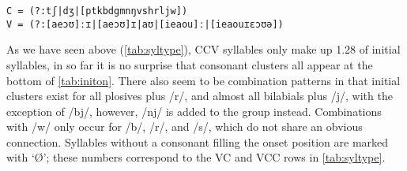 \ex
	\texttt{C = (?:tʃ|dʒ|[ptkbdgmnŋvshrljw])\\
	V = (?:[aeɔʊ]ːɪ|[aeɔʊ]ɪ|aʊ|[ieaou]ː|[ieaouɪɛɔʊə])}
\xe

As we have seen above (\autoref{tab:syltype}), CCV syllables only make up 
1.28\pct{} of initial syllables, in so far it is no surprise that consonant 
clusters all appear at the bottom of \autoref{tab:initon}. There also seem to 
be combination patterns in that initial clusters exist for all plosives plus /r/, 
and almost all bilabials plus /j/, with the exception of /bj/, however, /nj/ is 
added to the group instead. Combinations with /w/ only occur for /b/, /r/, and 
/s/, which do not share an obvious connection. Syllables without a consonant 
filling the onset position are marked with \enquote*{Ø}; these numbers 
correspond to the VC and VCC rows in \autoref{tab:syltype}.

